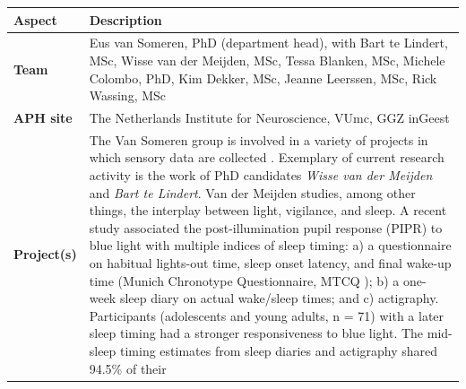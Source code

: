 \documentclass[]{book}
\begin{document}
\begin{longtable}[]{@{}ll@{}}
\toprule
\begin{minipage}[b]{0.25\columnwidth}\raggedright\strut
\textbf{Aspect}\strut
\end{minipage} & \begin{minipage}[b]{0.69\columnwidth}\raggedright\strut
\textbf{Description}\strut
\end{minipage}\tabularnewline
\midrule
\endhead
\begin{minipage}[t]{0.25\columnwidth}\raggedright\strut
\textbf{Team}\strut
\end{minipage} & \begin{minipage}[t]{0.69\columnwidth}\raggedright\strut
Eus van Someren, PhD (department head), with Bart te Lindert, MSc, Wisse
van der Meijden, MSc, Tessa Blanken, MSc, Michele Colombo, PhD, Kim
Dekker, MSc, Jeanne Leerssen, MSc, Rick Wassing, MSc\strut
\end{minipage}\tabularnewline
\begin{minipage}[t]{0.25\columnwidth}\raggedright\strut
\textbf{APH site}\strut
\end{minipage} & \begin{minipage}[t]{0.69\columnwidth}\raggedright\strut
The Netherlands Institute for Neuroscience, VUmc, GGZ inGeest\strut
\end{minipage}\tabularnewline
\begin{minipage}[t]{0.25\columnwidth}\raggedright\strut
\textbf{Project(s)}\strut
\end{minipage} & \begin{minipage}[t]{0.69\columnwidth}\raggedright\strut
The Van Someren group is involved in a variety of projects in which
sensory data are collected \citep[see,
e.g.,][\citet{VanSomeren2000}]{VanSomeren2011}. Exemplary of current
research activity is the work of PhD candidates \emph{Wisse van der
Meijden} and \emph{Bart te Lindert}. Van der Meijden studies, among
other things, the interplay between light, vigilance, and sleep. A
recent study associated the post-illumination pupil response (PIPR) to
blue light with multiple indices of sleep timing: a) a questionnaire on
habitual lights-out time, sleep onset latency, and final wake-up time
(Munich Chronotype Questionnaire, MTCQ \citep{Roenneberg2003}); b) a
one-week sleep diary on actual wake/sleep times; and c) actigraphy.
Participants (adolescents and young adults, n = 71) with a later sleep
timing had a stronger responsiveness to blue light. The mid-sleep timing
estimates from sleep diaries and actigraphy shared 94.5\% of their

\end{minipage}
\end{longtable}
\end{document}
